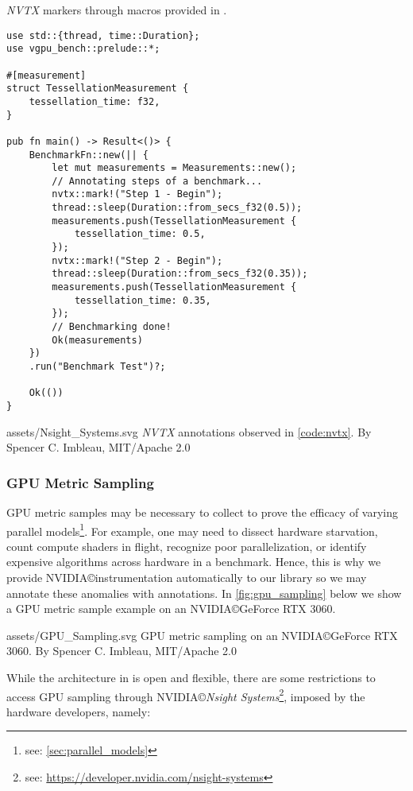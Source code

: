 \begin{snippet}
\caption{\textit{NVTX} markers through macros provided in \toolname.}\label{code:nvtx}
\begin{verbatim}
use std::{thread, time::Duration};
use vgpu_bench::prelude::*;

#[measurement]
struct TessellationMeasurement {
    tessellation_time: f32,
}

pub fn main() -> Result<()> {
    BenchmarkFn::new(|| {
        let mut measurements = Measurements::new();
        // Annotating steps of a benchmark...
        nvtx::mark!("Step 1 - Begin");
        thread::sleep(Duration::from_secs_f32(0.5));
        measurements.push(TessellationMeasurement {
            tessellation_time: 0.5,
        });
        nvtx::mark!("Step 2 - Begin");
        thread::sleep(Duration::from_secs_f32(0.35));
        measurements.push(TessellationMeasurement {
            tessellation_time: 0.35,
        });
        // Benchmarking done!
        Ok(measurements)
    })
    .run("Benchmark Test")?;

    Ok(())
}
\end{verbatim}
\end{snippet}

\widesvg
{assets/Nsight_Systems.svg}
{\textit{NVTX} annotations observed in \cref{code:nvtx}.\label{fig:sampling}}
{By Spencer C. Imbleau, MIT/Apache 2.0}
\medskip

\subsubsection{GPU Metric Sampling}
GPU metric samples may be necessary to collect to prove the efficacy of varying parallel models\footnote{see: \cref{sec:parallel_models}}. For example, one may need to dissect hardware starvation, count compute shaders in flight, recognize poor parallelization, or identify expensive algorithms across hardware in a benchmark. Hence, this is why we provide NVIDIA\copyright instrumentation automatically to our library so we may annotate these anomalies with annotations. In \cref{fig:gpu_sampling} below we show a GPU metric sample example on an NVIDIA\copyright GeForce RTX 3060.

\widesvg
{assets/GPU_Sampling.svg}
{GPU metric sampling on an NVIDIA\copyright GeForce RTX 3060.\label{fig:gpu_sampling}}
{By Spencer C. Imbleau, MIT/Apache 2.0}
\medskip

While the architecture in \toolname is open and flexible, there are some restrictions to access GPU sampling through NVIDIA\copyright \textit{Nsight Systems}\footnote{see: \href{https://developer.nvidia.com/nsight-systems}{https://developer.nvidia.com/nsight-systems}}, imposed by the hardware developers, namely:

